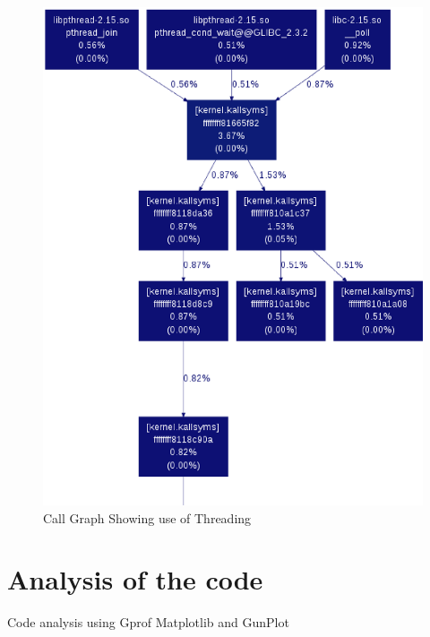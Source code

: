 \documentclass[a4paper,11pt]{article}
\begin{document}
	\begin{figure}[ht]
			\begin{center}
		\includegraphics[width=115mm]{threading.eps}
		\caption{Call Graph Showing use of Threading}	
		\label{fig:Threading}
		\end{center}
	\end{figure}

\pagebreak

\section{Analysis of the code}
Code analysis using Gprof Matplotlib and GunPlot
\end{document}
